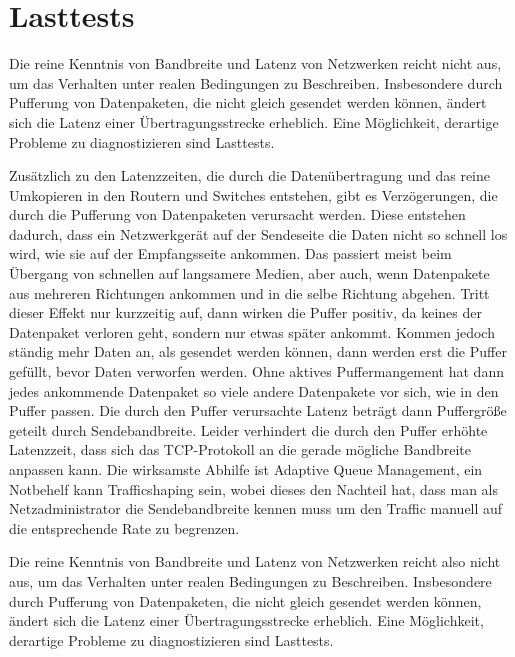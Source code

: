 \section{Lasttests}
\label{sec:netz-performance-lasttests}
\begin{abstractsec}
  Die reine Kenntnis von Bandbreite und Latenz von Netzwerken reicht nicht
  aus, um das Verhalten unter realen Bedingungen zu Beschreiben. Insbesondere
  durch Pufferung von Datenpaketen, die nicht gleich gesendet werden können,
  ändert sich die Latenz einer Übertragungsstrecke erheblich. Eine
  Möglichkeit, derartige Probleme zu diagnostizieren sind Lasttests.
\end{abstractsec}
\begin{normaltext}
  Zusätzlich zu den Latenzzeiten, die durch die Datenübertragung und das
  reine Umkopieren in den Routern und Switches entstehen, gibt es
  Verzögerungen, die durch die Pufferung von Datenpaketen verursacht werden.
  Diese entstehen dadurch, dass ein Netzwerkgerät auf der Sendeseite die Daten
  nicht so schnell los wird, wie sie auf der Empfangsseite ankommen. Das
  passiert meist beim Übergang von schnellen auf langsamere Medien, aber auch,
  wenn Datenpakete aus mehreren Richtungen ankommen und in die selbe Richtung
  abgehen. Tritt dieser Effekt nur kurzzeitig auf, dann wirken die Puffer
  positiv, da keines der Datenpaket verloren geht, sondern nur etwas später
  ankommt. Kommen jedoch ständig mehr Daten an, als gesendet werden können,
  dann werden erst die Puffer gefüllt, bevor Daten verworfen werden. Ohne
  aktives Puffermangement hat dann jedes ankommende Datenpaket so viele andere
  Datenpakete vor sich, wie in den Puffer passen. Die durch den Puffer
  verursachte Latenz beträgt dann Puffergröße geteilt durch Sendebandbreite.
  Leider verhindert die durch den Puffer erhöhte Latenzzeit, dass sich das
  TCP-Protokoll an die gerade mögliche Bandbreite anpassen kann. Die
  wirksamste  Abhilfe ist Adaptive Queue Management, ein Notbehelf kann
  Trafficshaping sein, wobei dieses den Nachteil hat, dass man als
  Netzadministrator die Sendebandbreite kennen muss um den Traffic manuell auf
  die entsprechende Rate zu begrenzen.

  Die reine Kenntnis von Bandbreite und Latenz von Netzwerken reicht also nicht
  aus, um das Verhalten unter realen Bedingungen zu Beschreiben. Insbesondere
  durch Pufferung von Datenpaketen, die nicht gleich gesendet werden können,
  ändert sich die Latenz einer Übertragungsstrecke erheblich. Eine
  Möglichkeit, derartige Probleme zu diagnostizieren sind Lasttests.


\end{normaltext}
